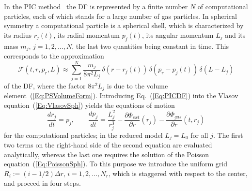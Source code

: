 In the PIC method~\cite{BirdsallLangdon-Book,HockneyEastwood-Book} the DF is represented by a finite number $N$ of computational particles, each of which stands for a large number of gas particles. In spherical symmetry a computational particle is a spherical shell, which is characterized by its radius $r_j(t)$, its radial momentum $p_j(t)$, its angular momentum $L_j$ and its mass $m_j$, $j = 1,2,\ldots,N$, the last two quantities being constant in time. This corresponds to the approximation
\begin{equation}
\mathcal{F}(t,r,p_r,L)\approx \sum\limits_{j=1}^N \frac{m_j}{8\pi^2 L_j}\,\delta(r - r_j(t))\,\delta(p_r - p_j(t))\,\delta(L - L_j)
\label{Eq:PICDF}
\end{equation}
of the DF, where the factor $8\pi^2 L_j$ is due to the volume element~(\ref{Eq:PSVolumeForm}). Introducing Eq.~(\ref{Eq:PICDF}) into the Vlasov equation~(\ref{Eq:VlasovSph}) yields the equations of motion
\begin{equation}
\frac{dr_j}{dt} = p_j,\qquad
\frac{dp_j}{dt} = \frac{L_j^2}{r_j^3} - \frac{\partial\Phi_{ext}}{\partial r}(r_j) - \frac{\partial\Phi_{gas}}{\partial r}(t,r_j)
\label{Eq:EOM}
\end{equation}
for the computational particles; in the reduced model $L_j = L_0$ for all $j$. The first two terms on the right-hand side of the second equation are evaluated analytically, whereas the last one requires the solution of the Poisson equation~(\ref{Eq:PoissonSph}). To this purpose we introduce the uniform grid $R_i := (i - 1/2)\Delta r$, $i = 1,2,\ldots,N_r$, which is staggered with respect to the center, and proceed in four steps.
